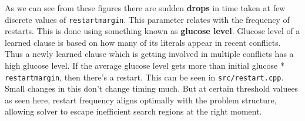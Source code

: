 \documentclass{article}
\begin{document}
    As we can see from these figures there are sudden \textbf{drops} in time
    taken at few discrete values of \texttt{restartmargin}. This parameter
    relates with the frequency of restarts. This is done using something known
    as \textbf{glucose level}. Glucose level of a learned clause is based on
    how many of its literals appear in recent conflicts. Thus a newly learned
    clause which is getting involved in multiple conflicts has a high glucose
    level. If the average glucose level gets more than initial glucose
    * \texttt{restartmargin}, then there's a restart. This can be seen in
    \texttt{src/restart.cpp}. Small changes in this don't change timing much.
    But at certain threshold valuees as seen here, restart frequency aligns
    optimally with the problem structure, allowing solver to escape inefficient
    search regions at the right moment.
\end{document}
